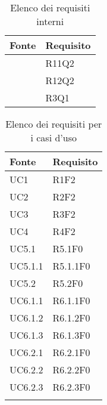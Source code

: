 			\begin{table}[H]
			\centering
			{\def\arraystretch{1.5}
				\begin{tabularx}{\textwidth}{YY}
					\textbf{Fonte} & \textbf{Requisito} \\
					\toprule
					 & R11Q2 \\
					 & R12Q2 \\
					  & R3Q1 \\
					\bottomrule
				\end{tabularx}}
			\caption{Elenco dei requisiti interni}
		\end{table}

		\begin{table}[H]
			\centering
			{\def\arraystretch{1.5}
			\begin{tabularx}{\textwidth}{YY}
				\textbf{Fonte} & \textbf{Requisito} \\				
				\toprule
				UC1 & R1F2 \\
				UC2 & R2F2 \\
				UC3 & R3F2 \\
				UC4 & R4F2 \\
				UC5.1 & R5.1F0 \\
				UC5.1.1 & R5.1.1F0 \\
				UC5.2 & R5.2F0 \\
				UC6.1.1 & R6.1.1F0 \\
				UC6.1.2 & R6.1.2F0 \\
				UC6.1.3 & R6.1.3F0 \\
				UC6.2.1 & R6.2.1F0 \\
				UC6.2.2 & R6.2.2F0 \\
				UC6.2.3 & R6.2.3F0 \\
				\bottomrule \\
			\end{tabularx}}
			\caption{Elenco dei requisiti per i casi d'uso}
		\end{table}
	
